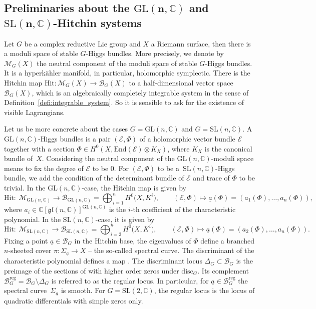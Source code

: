 \documentclass[pdftex]{sigma}
\numberwithin{equation}{section}
\theoremstyle{definition}
\newcommand{\End}{\mathrm{End}}
\newcommand{\disc}{\mathrm{disc}}
\newcommand{\reg}{\mathrm{reg}}
\renewcommand{\to}{\rightarrow}
\newcommand{\calB}{\mathcal{B}}
\newcommand{\calE}{\mathcal{E}}
\newcommand{\calM}{\mathcal{M}}
\newcommand{\CC}{\mathbb{C}}
\newcommand{\C}{\mathbb{C}}
\newcommand{\Hit}{\mathrm{Hit}}
\newcommand{\GL}{\mathrm{GL}}
\newcommand{\SL}{\mathrm{SL}}
\newcommand{\gl}{\mathfrak{gl}}
\begin{document}
\subsection[Preliminaries about the GL(n,C) and SL(n,C)-Hitchin systems]{Preliminaries about the $\boldsymbol{\GL(n,\CC)}$ and $\boldsymbol{\SL(n,\CC)}$-Hitchin systems}\label{sec:prel-Hitchin_syst}

Let $G$ be a complex reductive Lie group and $X$ a Riemann surface, then there is a moduli space of stable $G$-Higgs bundles. More precisely, we denote by $\calM_G(X)$ the neutral component of the moduli space of stable $G$-Higgs bundles. It is a hyperk\"ahler manifold, in particular, holomorphic symplectic. There is the Hitchin map $\Hit\colon \calM_G(X) \to \calB_G(X)$ to a half-dimensional vector space $\calB_G(X)$, which is an algebraically completely integrable system in the sense of Definition~\ref{defi:integrable_system}. So it is sensible to ask for the existence of visible Lagrangians.

Let us be more concrete about the cases $G=\GL(n,\CC)$ and $G=\SL(n,\CC)$. A $\GL(n,\CC)$-Higgs bundles is a pair $(\calE,\Phi)$ of a holomorphic vector bundle $\calE$ together with a section $\Phi \in H^0(X,\End(\calE)\otimes K_X)$, where $K_X$ is the canonical bundle of~$X$. Considering the neutral component of the $\GL(n,\C)$-moduli space means to fix the degree of $\calE$ to be $0$. For $(\calE,\Phi)$ to be a~$\SL(n,\CC)$-Higgs bundle, we add the condition of the determinant bundle of $\calE$ and trace of $\Phi$ to be trivial. In the $\GL(n,\CC)$-case, the Hitchin map is given by
\[ \Hit\colon \ \calM_{\GL(n,\CC)} \to \calB_{\GL(n,\CC)}= \bigoplus_{i=1}^n H^0\bigl(X,K^i\bigr), \qquad (\calE,\Phi) \mapsto \underline{a}(\Phi)=(a_1(\Phi),\dots,a_n(\Phi)),
\]
where $a_i \in \CC[\gl(n,\CC)]^{\GL(n,\CC)}$ is the $i$-th coefficient of the characteristic polynomial. In the $\SL(n,\CC)$-case, it is given by
\[ \Hit \colon \ \calM_{\SL(n,\CC)} \to \calB_{\SL(n,\CC)}= \bigoplus_{i=2}^n H^0\bigl(X,K^i\bigr), \qquad (\calE,\Phi) \mapsto \underline{a}(\Phi)=(a_2(\Phi),\dots,a_n(\Phi)).
\]
Fixing a point $\underline{a} \in \calB_G$ in the Hitchin base, the eigenvalues of $\Phi$ define a branched $n$-sheeted cover $\pi\colon \Sigma_{\underline{a}} \to X$ -- the so-called spectral curve. The discriminant of the characteristic polynomial defines a map \smash{$\disc_G\colon \calB_G \to H^0\bigl(X,K^{r(r-1)}\bigr)$}. The discriminant locus $\Delta_G \subset \calB_G$ is the preimage of the sections of  with higher order zeros under $\disc_G$. Its complement $\calB_G^{\reg}=\calB_G \setminus \Delta_G$ is referred to as the regular locus. In particular, for $\underline{a} \in \calB^{\reg}_G$ the spectral curve~$\Sigma_{\underline{a}}$ is smooth. For $G=\SL(2,\CC)$, the regular locus \smash{$\calB_{\SL(2,\CC)}^{\reg}$} is the locus of quadratic differentials with simple zeros only.
\end{document}
